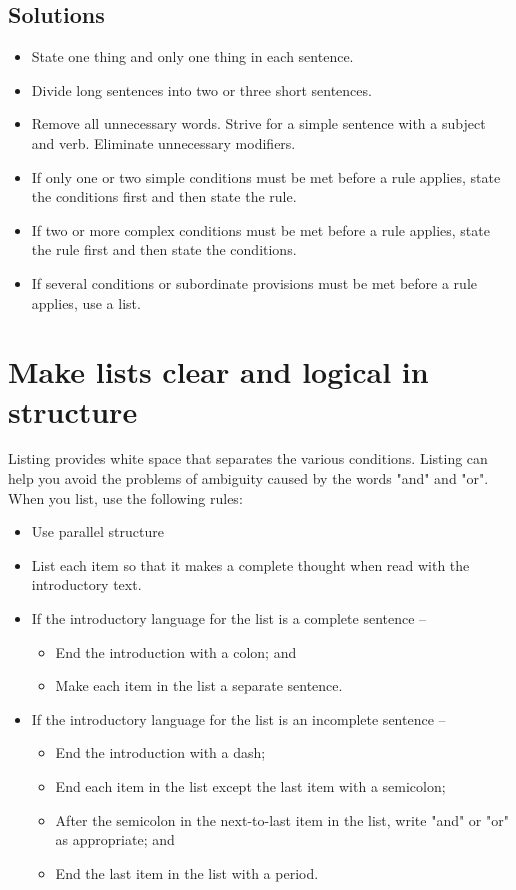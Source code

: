 \documentclass[12pt, letterpaper]{report}
\begin{document}
\begin{linenumbers}
\subsection*{Solutions}
\begin{itemize}
    \item State one thing and only one thing in each sentence.
\item Divide long sentences into two or three short sentences.
\item Remove all unnecessary words. Strive for a simple sentence with a subject and verb. Eliminate unnecessary modifiers.
\item If only one or two simple conditions must be met before a rule applies, state the conditions first and then state the rule.
\item If two or more complex conditions must be met before a rule applies, state the rule first and then state the conditions.
\item If several conditions or subordinate provisions must be met before a rule applies, use a list.
\end{itemize}
\section{Make lists clear and logical in structure}
 Listing provides white space that separates the various conditions. Listing can help you avoid the problems of ambiguity caused by the words "and" and "or". When you list, use the following rules:
 \begin{itemize}
     \item Use parallel structure
     \item List each item so that it makes a complete thought when read with the introductory text. 
     \item If the introductory language for the list is a complete sentence --
     \begin{itemize}
         \item End the introduction with a colon; and
        \item Make each item in the list a separate sentence.
     \end{itemize}
     \item If the introductory language for the list is an incomplete sentence -- 
     \begin{itemize}
         \item End the introduction with a dash;
\item End each item in the list except the last item with a semicolon;
\item After the semicolon in the next-to-last item in the list, write "and" or "or" as appropriate; and
\item End the last item in the list with a period.
     \end{itemize}
 \end{itemize}

\end{linenumbers}
\end{document}
